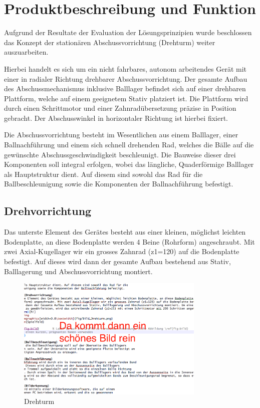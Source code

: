 \section{Produktbeschreibung und Funktion}

Aufgrund der Resultate der Evaluation der Lösungsprinzipien wurde beschlossen 
das Konzept der stationären Abschussvorrichtung (Drehturm) weiter 
auszuarbeiten. 

Hierbei handelt es sich um ein nicht fahrbares, autonom arbeitendes Gerät mit 
einer in radialer Richtung drehbarer Abschussvorrichtung. Der gesamte Aufbau 
des Abschussmechanismus inklusive Balllager befindet sich auf einer drehbaren 
Plattform, welche auf einem geeignetem Stativ platziert ist. Die Plattform 
wird durch einen Schrittmotor und einer Zahnradübersetzung präzise in Position 
gebracht. Der Abschusswinkel in horizontaler Richtung ist hierbei fixiert. 

Die Abschussvorrichtung besteht im Wesentlichen aus einem Balllager, einer 
Ballnachführung und einem sich schnell drehenden Rad, welches die Bälle auf 
die gewünschte Abschussgeschwindigkeit beschleunigt. Die Bauweise dieser drei 
Komponenten soll integral erfolgen, wobei das längliche, Quaderförmige 
Balllager als Hauptstruktur dient. Auf diesem sind sowohl das Rad für die 
Ballbeschleunigung sowie die Komponenten der Ballnachführung befestigt.

\subsection{Drehvorrichtung}
Das unterste Element des Gerätes besteht aus einer kleinen, möglichst leichten Bodenplatte, an diese Bodenplatte werden 4 Beine (Rohrform) angeschraubt. Mit zwei Axial-Kugellager wir ein grosses Zahnrad (z1=120) auf die Bodenplatte befestigt. Auf dieses wird dann der gesamte Aufbau bestehend aus Stativ, Balllagerung und Abschussvorrichtung montiert. 

\begin{figure}[h!]          
	\centering             
	\includegraphics[width=0.8\textwidth]{fig/Bild_Drehturm.png}    
	\caption{Drehturm}
	
	\label{fig:bild}        %
\end{figure}

